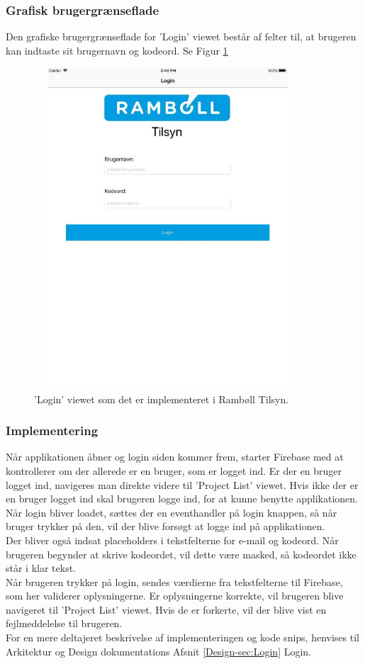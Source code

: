 \subsubsection{Grafisk brugergrænseflade}
Den grafiske brugergrænseflade for 'Login' viewet består af felter til, at brugeren kan indtaste sit brugernavn og kodeord. Se Figur \ref{fig:LoginView}
\begin{figure}[H] %
	\centering
	\includegraphics[height=12cm, width=10cm]{Design/Applikation/Login/LoginView}
	\caption{'Login' viewet som det er implementeret i Rambøll Tilsyn.}
	\label{fig:LoginView}
\end{figure}

\subsubsection{Implementering}
Når applikationen åbner og login siden kommer frem, starter Firebase med at kontrollerer om der allerede er en bruger, som er logget ind. Er der en bruger logget ind, navigeres man direkte videre til 'Project List' viewet. Hvis ikke der er en bruger logget ind skal brugeren logge ind, for at kunne benytte applikationen. \\
Når login bliver loadet, sættes der en eventhandler på login knappen, så når bruger trykker på den, vil der blive forsøgt at logge ind på applikationen. \\
Der bliver også indsat placeholders i tekstfelterne for e-mail og kodeord. Når brugeren begynder at skrive kodeordet, vil dette være masked, så kodeordet ikke står i klar tekst. \\
Når brugeren trykker på login, sendes værdierne fra tekstfelterne til Firebase, som her validerer oplysningerne. Er oplysningerne korrekte, vil brugeren blive navigeret til 'Project List' viewet. Hvis de er forkerte, vil der blive vist en fejlmeddelelse til brugeren. \\
For en mere deltajeret beskrivelse af implementeringen og kode snips, henvises til Arkitektur og Design dokumentations Afsnit \ref{Design-sec:Login} Login.

\clearpage